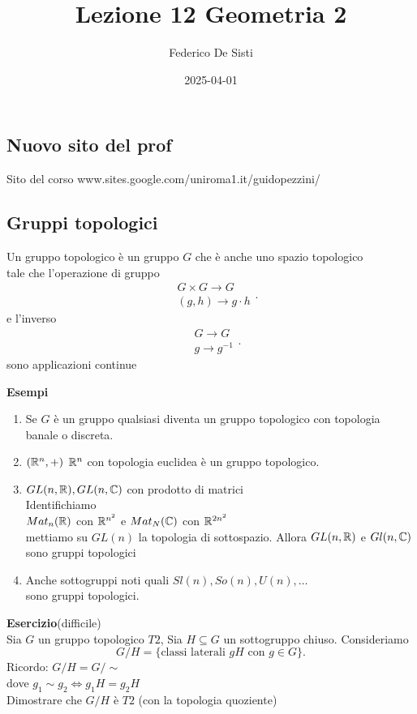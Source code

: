 \documentclass[12px]{article}
\title{Lezione 12 Geometria 2}
\date{2025-04-01}
\author{Federico De Sisti}
\begin{document}
	\maketitle
	\newpage
	\subsection{Nuovo sito del prof}
	Sito del corso www.sites.google.com/uniroma1.it/guidopezzini/\\
	\subsection{Gruppi topologici}
	\begin{defi}
		Un gruppo topologico è un gruppo $G$ che è anche uno spazio topologico\\
		tale che l'operazione di gruppo
		\[
		\begin{aligned}
			&G\times G \rightarrow G\\
			& (g,h) \rightarrow g\cdot h
		\end{aligned}
		.\] 
		e l'inverso
		\[
		\begin{aligned}
			&G \rightarrow G\\
			& g \rightarrow g^{-1}
		\end{aligned}
		.\] 
		sono applicazioni continue
	\end{defi}
	\textbf{Esempi}
	\begin{enumerate}
		\item Se $G$ è un gruppo qualsiasi diventa un gruppo topologico con topologia banale o discreta.
		\item $(\mathbb{R}^n,+)$ $\mathbb{R}^n$ con topologia euclidea è un gruppo topologico.
		\item  $GL(n,\mathbb{R}), GL(n,\mathbb{C})$ con prodotto di matrici\\
			Identifichiamo \\
			$Mat_n(\mathbb{R})$ con $\mathbb{R}^{n^2}$ e  $Mat_N(\mathbb{C})$ con $\mathbb{R}^{2n^2}$\\
			mettiamo su  $GL(n)$ la topologia di sottospazio. Allora $GL(n,\mathbb{R})$ e  $Gl(n,\mathbb{C})$ sono gruppi topologici 
		\item Anche sottogruppi noti quali $Sl(n), So(n), U(n),\ldots$ \\
			sono gruppi topologici.
	\end{enumerate}
	\textbf{Esercizio}(difficile)\\
	Sia  $G$ un gruppo topologico $T2$, Sia $H\subseteq G$ un sottogruppo chiuso. Consideriamo
	 \[
		 G/H = \{\text{classi laterali }gH \text{ con } g\in G\}
	.\] 
	Ricordo: $G/H = G/\sim$\\
	dove  $g_1\sim g_2 \Leftrightarrow g_1H = g_2H$\\
	Dimostrare che $G/H$ è $T2$ (con la topologia quoziente)\
	\newpage
\end{document}
